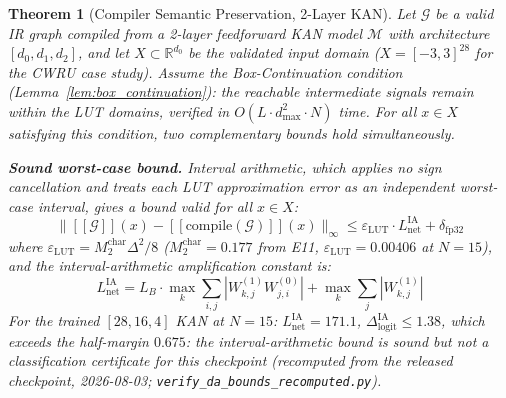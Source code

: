 \documentclass[journal,onecolumn]{IEEEtran}
\newcommand{\llbracket}{[\![}
\newcommand{\rrbracket}{]\!]}
\newtheorem{theorem}{Theorem}
\begin{document}
\setcounter{theorem}{0}
\begin{theorem}[Compiler Semantic Preservation, 2-Layer KAN]
\label{thm:compiler}
Let $\mathcal{G}$ be a valid IR graph compiled from a 2-layer feedforward KAN
model $\mathcal{M}$ with architecture $[d_0, d_1, d_2]$, and let
$X \subset \mathbb{R}^{d_0}$ be the validated input domain
($X = [-3,3]^{28}$ for the CWRU case study). Assume the
Box-Continuation condition (Lemma~\ref{lem:box_continuation}): the
reachable intermediate signals remain within the LUT domains, verified
in $O(L \cdot d_{\max}^2 \cdot N)$ time. For all $x \in X$ satisfying this condition, two complementary
bounds hold simultaneously.

\textbf{Sound worst-case bound.} Interval arithmetic, which applies no
sign cancellation and treats each LUT approximation error as an independent
worst-case interval, gives a bound valid for all $x \in X$:
\begin{equation}
\|\llbracket\mathcal{G}\rrbracket(x) - \llbracket\text{compile}
(\mathcal{G})\rrbracket(x)\|_\infty \leq \varepsilon_{\text{LUT}}
\cdot L_{\text{net}}^{\text{IA}} + \delta_{\text{fp32}}
\label{eq:theorem1}
\end{equation}
where $\varepsilon_{\text{LUT}} = M_2^{\text{char}}\Delta^2/8$
($M_2^{\text{char}} = 0.177$ from E11, $\varepsilon_{\text{LUT}} = 0.00406$
at $N=15$), and the interval-arithmetic amplification constant is:
\begin{equation}
L_{\text{net}}^{\text{IA}} = L_B \cdot \max_{k} \sum_{i,j}
|W^{(1)}_{k,j} W^{(0)}_{j,i}|
+ \max_{k} \sum_{j} |W^{(1)}_{k,j}|
\label{eq:l_net_ia}
\end{equation}
For the trained $[28,16,4]$ KAN at $N=15$:
$L_{\text{net}}^{\text{IA}} = 171.1$,
$\Delta_{\text{logit}}^{\text{IA}} \leq \mathbf{1.38}$,
which exceeds the half-margin $0.675$: the interval-arithmetic bound is
sound but not a classification certificate for this checkpoint
(recomputed from the released checkpoint, 2026-08-03;
\texttt{verify\_da\_bounds\_recomputed.py}).


\end{theorem}
\end{document}
